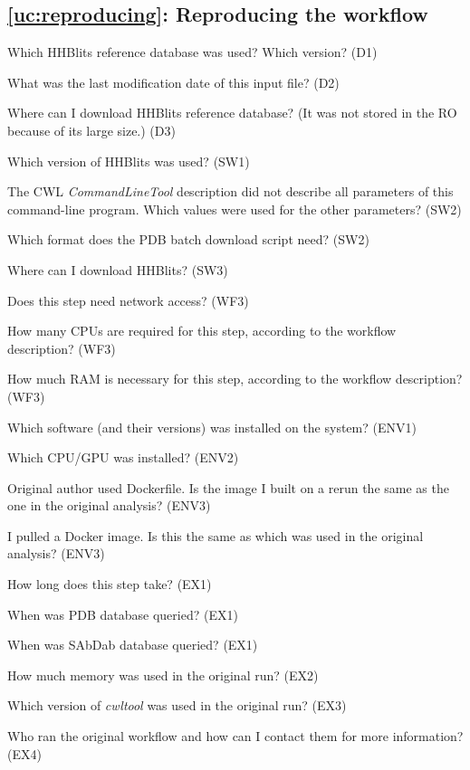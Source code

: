 \subsection{\ref{uc:reproducing}: Reproducing the workflow}

\begin{provquestions}[resume]
    \item Which HHBlits reference database was used? Which version? (D1)
    \item What was the last modification date of this input file? (D2)
    \item Where can I download HHBlits reference database? (It was not stored in the RO because of its large size.) (D3)
    \item Which version of HHBlits was used? (SW1)
    \item The CWL \emph{CommandLineTool} description did not describe all parameters of this command-line program. Which values were used for the other parameters? (SW2)
    \item Which format does the PDB batch download script need? (SW2)
    \item Where can I download HHBlits? (SW3)
    \item Does this step need network access? (WF3)
    \item How many CPUs are required for this step, according to the workflow description? (WF3)
    \item How much RAM is necessary for this step, according to the workflow description? (WF3)
    \item Which software (and their versions) was installed on the system? (ENV1) 
    \item Which CPU/GPU was installed? (ENV2)
    \item Original author used Dockerfile. Is the image I built on a rerun the same as the one in the original analysis?  (ENV3)
    \item I pulled a Docker image. Is this the same as which was used in the original analysis? (ENV3)
    \item How long does this step take? (EX1)
    \item When was PDB database queried? (EX1)
    \item When was SAbDab database queried? (EX1)
    \item How much memory was used in the original run? (EX2)
    \item Which version of \emph{cwltool} was used in the original run? (EX3)
    \item Who ran the original workflow and how can I contact them for more information? (EX4)
\end{provquestions}

